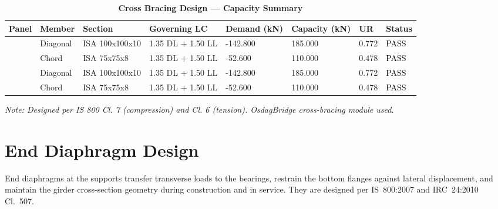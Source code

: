 \documentclass[12pt,a4paper]{report}
\numberwithin{table}{chapter}
\numberwithin{figure}{chapter}
\begin{document}
\vspace{1em}
\begin{longtable}{|C{2.0cm}|L{1.8cm}|C{2.2cm}|C{3.0cm}|C{1.8cm}|C{1.8cm}|C{1.2cm}|C{1.8cm}|}
\caption{\textbf{Cross Bracing Design --- Capacity Summary}}
\hline
\textbf{Panel} & \textbf{Member} & \textbf{Section} & \textbf{Governing LC} & \textbf{Demand (kN)} & \textbf{Capacity (kN)} & \textbf{UR} & \textbf{Status} \\[6pt]
\hline
{} & Diagonal & ISA 100x100x10 & 1.35 DL + 1.50 LL & -142.800 & 185.000 & 0.772 & \textcolor{black}{PASS} \\[6pt]
 & Chord & ISA 75x75x8 & 1.35 DL + 1.50 LL & -52.600 & 110.000 & 0.478 & \textcolor{black}{PASS} \\[6pt]
\hline
{} & Diagonal & ISA 100x100x10 & 1.35 DL + 1.50 LL & -142.800 & 185.000 & 0.772 & \textcolor{black}{PASS} \\[6pt]
 & Chord & ISA 75x75x8 & 1.35 DL + 1.50 LL & -52.600 & 110.000 & 0.478 & \textcolor{black}{PASS} \\[6pt]
\hline
\end{longtable}
\noindent\textit{Note: Designed per IS 800 Cl. 7 (compression) and Cl. 6 (tension). OsdagBridge cross-bracing module used.}

\section{End Diaphragm Design}
\label{sec:end-diaphragm}

End diaphragms at the supports transfer transverse loads to the bearings, restrain the bottom flanges against lateral displacement, and maintain the girder cross-section geometry during construction and in service. They are designed per IS~800:2007 and IRC~24:2010 Cl.~507.

\vspace{1em}

\vspace{0.4em}
\noindent
\setlength{\tabcolsep}{4pt}
\setlength{\LTleft}{0pt}
\setlength{\LTright}{\fill}
\end{document}
